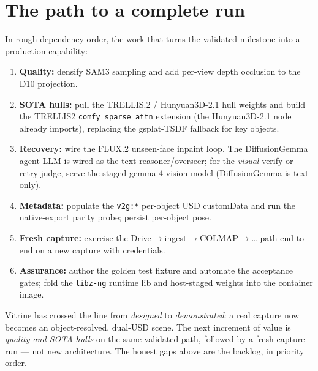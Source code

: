 \documentclass[a4paper,11pt]{report}
\newcommand{\code}[1]{\texttt{#1}}
\begin{document}
\section{The path to a complete run}
In rough dependency order, the work that turns the validated milestone into a production capability:
\begin{enumerate}
  \item \textbf{Quality:} densify SAM3 sampling and add per-view depth occlusion to the D10 projection.
  \item \textbf{SOTA hulls:} pull the TRELLIS.2 / Hunyuan3D-2.1 hull weights and build the TRELLIS2
        \code{comfy\_sparse\_attn} extension (the Hunyuan3D-2.1 node already imports), replacing the
        gsplat-TSDF fallback for key objects.
  \item \textbf{Recovery:} wire the FLUX.2 unseen-face inpaint loop. The DiffusionGemma agent LLM is wired
        as the text reasoner/overseer; for the \emph{visual} verify-or-retry judge, serve the staged gemma-4
        vision model (DiffusionGemma is text-only).
  \item \textbf{Metadata:} populate the \code{v2g:*} per-object USD customData and run the native-export
        parity probe; persist per-object pose.
  \item \textbf{Fresh capture:} exercise the Drive$\rightarrow$ingest$\rightarrow$COLMAP$\rightarrow$\dots
        path end to end on a new capture with credentials.
  \item \textbf{Assurance:} author the golden test fixture and automate the acceptance gates; fold the
        \code{libz-ng} runtime lib and host-staged weights into the container image.
\end{enumerate}

\begin{recommendation}
Vitrine has crossed the line from \emph{designed} to \emph{demonstrated}: a real capture now becomes an
object-resolved, dual-USD scene. The next increment of value is \emph{quality and SOTA hulls} on the same
validated path, followed by a fresh-capture run --- not new architecture. The honest gaps above are the
backlog, in priority order.
\end{recommendation}
\end{document}
